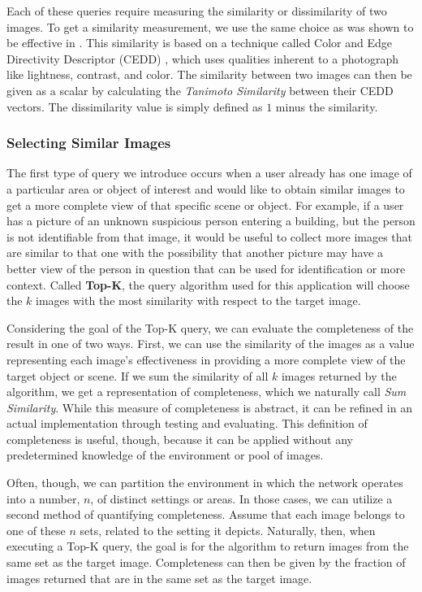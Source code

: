 Each of these queries require measuring the similarity or dissimilarity of two images.  To get a similarity measurement, we use the same choice as was shown to be effective in \cite{mediascope}.  This similarity is based on a technique called Color and Edge Directivity Descriptor (CEDD) \cite{2008cedd}, which uses qualities inherent to a photograph like lightness, contrast, and color.  The similarity between two images can then be given as a scalar by calculating the \emph{Tanimoto Similarity} \cite{tanimoto} between their CEDD vectors.  The dissimilarity value is simply defined as $1$ minus the similarity.

\subsubsection{Selecting Similar Images}

The first type of query we introduce occurs when a user already has one image of a particular area or object of interest and would like to obtain similar images to get a more complete view of that specific scene or object.  For example, if a user has a picture of an unknown suspicious person entering a building, but the person is not identifiable from that image, it would be useful to collect more images that are similar to that one with the possibility that another picture may have a better view of the person in question that can be used for identification or more context.  Called {\bf Top-K}, the query algorithm used for this application will choose the $k$ images with the most similarity with respect to the target image.  

Considering the goal of the Top-K query, we can evaluate the completeness of the result in one of two ways.  First, we can use the similarity of the images as a value representing each image's effectiveness in providing a more complete view of the target object or scene.  If we sum the similarity of all $k$ images returned by the algorithm, we get a representation of completeness, which we naturally call \emph{Sum Similarity}.  While this measure of completeness is abstract, it can be refined in an actual implementation through testing and evaluating.  This definition of completeness is useful, though, because it can be applied without any predetermined knowledge of the environment or pool of images.  

Often, though, we can partition the environment in which the network operates into a number, $n$, of distinct settings or areas.  In those cases, we can utilize a second method of quantifying completeness.  Assume that each image belongs to one of these $n$ sets, %
related to the setting it depicts.  Naturally, then, when executing a Top-K query, the goal is for the algorithm to return images from the same set as the target image.  Completeness can then be given by the fraction of images returned that are in the same set as the target image.

